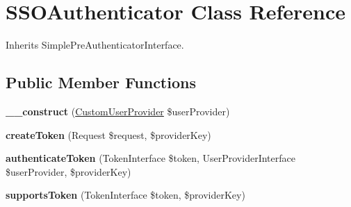 \hypertarget{class_site_1_1_trail_bundle_1_1_security_1_1_s_s_o_authenticator}{}\section{S\+S\+O\+Authenticator Class Reference}
\label{class_site_1_1_trail_bundle_1_1_security_1_1_s_s_o_authenticator}


Inherits Simple\+Pre\+Authenticator\+Interface.

\subsection*{Public Member Functions}
\begin{DoxyCompactItemize}
\item 
\hypertarget{class_site_1_1_trail_bundle_1_1_security_1_1_s_s_o_authenticator_a38f283cf166da2d5f73e96f0e9253561}{}{\bfseries \+\_\+\+\_\+construct} (\hyperlink{class_site_1_1_trail_bundle_1_1_security_1_1_custom_user_provider}{Custom\+User\+Provider} \$user\+Provider)\label{class_site_1_1_trail_bundle_1_1_security_1_1_s_s_o_authenticator_a38f283cf166da2d5f73e96f0e9253561}

\item 
\hypertarget{class_site_1_1_trail_bundle_1_1_security_1_1_s_s_o_authenticator_ae2f23a9b52d4f48e0c175c65b290d78e}{}{\bfseries create\+Token} (Request \$request, \$provider\+Key)\label{class_site_1_1_trail_bundle_1_1_security_1_1_s_s_o_authenticator_ae2f23a9b52d4f48e0c175c65b290d78e}

\item 
\hypertarget{class_site_1_1_trail_bundle_1_1_security_1_1_s_s_o_authenticator_acb1ee8e920d924c250f78e009e0791ba}{}{\bfseries authenticate\+Token} (Token\+Interface \$token, User\+Provider\+Interface \$user\+Provider, \$provider\+Key)\label{class_site_1_1_trail_bundle_1_1_security_1_1_s_s_o_authenticator_acb1ee8e920d924c250f78e009e0791ba}

\item 
\hypertarget{class_site_1_1_trail_bundle_1_1_security_1_1_s_s_o_authenticator_a180d5949e296e7d951dd1750b46f9009}{}{\bfseries supports\+Token} (Token\+Interface \$token, \$provider\+Key)\label{class_site_1_1_trail_bundle_1_1_security_1_1_s_s_o_authenticator_a180d5949e296e7d951dd1750b46f9009}

\end{DoxyCompactItemize}
